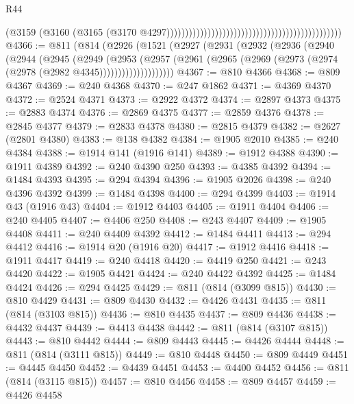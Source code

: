 \begin{lexlean}{R44}
\begin{coremodule}
{                                                                                          (@3159
                                                                                            (@3160
                                                                                              (@3165
                                                                                                (@3170
                                                                                                  @4297)))))))))))))))))))))))))))))))))))))))))))))))
@4366 := @811
    (@814
      (@2926
        (@1521
          (@2927
            (@2931
              (@2932
                (@2936
                  (@2940
                    (@2944
                      (@2945
                        (@2949
                          (@2953
                            (@2957
                              (@2961
                                (@2965 (@2969 (@2973 (@2974 (@2978 (@2982 @4345))))))))))))))))))))
@4367 := @810 @4366
@4368 := @809 @4367
@4369 := @240 @4368
@4370 := @247 @1862
@4371 := @4369 @4370
@4372 := @2524 @4371
@4373 := @2922 @4372
@4374 := @2897 @4373
@4375 := @2883 @4374
@4376 := @2869 @4375
@4377 := @2859 @4376
@4378 := @2845 @4377
@4379 := @2833 @4378
@4380 := @2815 @4379
@4382 := @2627 (@2801 @4380)
@4383 := @138 @4382
@4384 := @1905 @2010
@4385 := @240 @4384
@4388 := @1914 @141 (@1916 @141)
@4389 := @1912 @4388
@4390 := @1911 @4389
@4392 := @240 @4390 @250
@4393 := @4385 @4392
@4394 := @1484 @4393
@4395 := @294 @4394
@4396 := @1905 @2026
@4398 := @240 @4396 @4392
@4399 := @1484 @4398
@4400 := @294 @4399
@4403 := @1914 @43 (@1916 @43)
@4404 := @1912 @4403
@4405 := @1911 @4404
@4406 := @240 @4405
@4407 := @4406 @250
@4408 := @243 @4407
@4409 := @1905 @4408
@4411 := @240 @4409 @4392
@4412 := @1484 @4411
@4413 := @294 @4412
@4416 := @1914 @20 (@1916 @20)
@4417 := @1912 @4416
@4418 := @1911 @4417
@4419 := @240 @4418
@4420 := @4419 @250
@4421 := @243 @4420
@4422 := @1905 @4421
@4424 := @240 @4422 @4392
@4425 := @1484 @4424
@4426 := @294 @4425
@4429 := @811 (@814 (@3099 @815))
@4430 := @810 @4429
@4431 := @809 @4430
@4432 := @4426 @4431
@4435 := @811 (@814 (@3103 @815))
@4436 := @810 @4435
@4437 := @809 @4436
@4438 := @4432 @4437
@4439 := @4413 @4438
@4442 := @811 (@814 (@3107 @815))
@4443 := @810 @4442
@4444 := @809 @4443
@4445 := @4426 @4444
@4448 := @811 (@814 (@3111 @815))
@4449 := @810 @4448
@4450 := @809 @4449
@4451 := @4445 @4450
@4452 := @4439 @4451
@4453 := @4400 @4452
@4456 := @811 (@814 (@3115 @815))
@4457 := @810 @4456
@4458 := @809 @4457
@4459 := @4426 @4458
}
\end{coremodule}
\end{lexlean}
